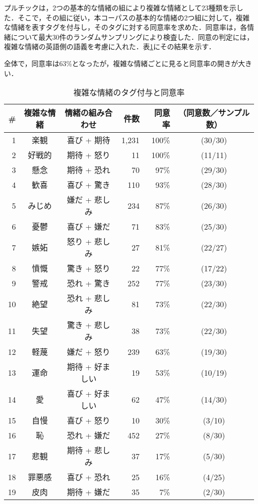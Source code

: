 \documentclass[japanese]{jnlp_1.3c}
\begin{document}
プルチックは，2つの基本的な情緒の組により複雑な情緒として23種類を示した．そこで，その組に従い，本コーパスの基本的な情緒の2つ組に対して，複雑な情緒を表すタグを付与し，そのタグに対する同意率を求めた．同意率は，各情緒について最大30件のランダムサンプリングにより検査した．同意の判定には，複雑な情緒の英語側の語義を考慮に入れた．表\ref{tab7}にその結果を示す．

全体で，同意率は63\%となったが，複雑な情緒ごとに見ると同意率の開きが大きい．

\begin{table}[t]
\begin{center}
\caption{複雑な情緒のタグ付与と同意率} \label{tab7}
\begin{tabular}{rccrrc}
\hline \hline
\#&複雑な情緒&情緒の組み合わせ&件数 &同意率&（同意数／サンプル数）\\
\hline
1&楽観     &喜び + 期待    &1,231 &100\%  &(30/30)\\
2&好戦的   &期待 + 怒り    &11   &100\%  &(11/11)\\
3&懸念     &期待 + 恐れ    &70   &97\%   &(29/30)\\
4&歓喜     &喜び + 驚き    &110  &93\%   &(28/30)\\
5&みじめ   &嫌だ + 悲しみ  &234  &87\%   &(26/30)\\
6&憂鬱     &喜び + 嫌だ    &71   &83\%   &(25/30)\\
7&嫉妬     &怒り + 悲しみ  &27   &81\%   &(22/27)\\
8&憤慨     &驚き + 怒り    &22   &77\%   &(17/22)\\
9&警戒     &恐れ + 驚き    &252  &77\%   &(23/30)\\
10&絶望     &恐れ + 悲しみ  &81   &73\%   &(22/30)\\
11&失望     &驚き + 悲しみ  &38   &73\%   &(22/30)\\
12&軽蔑     &嫌だ + 怒り    &239  &63\%   &(19/30)\\
13&運命     &期待 + 好ましい&19   &53\%   &(10/19)\\
14&愛       &喜び + 好ましい&62   &47\%   &(14/30)\\
15&自慢     &喜び + 怒り    &10   &30\%   &(3/10)\\
16&恥       &恐れ + 嫌だ    &452  &27\%   &(8/30)\\
17&悲観     &期待 + 悲しみ  &37   &17\%   &(5/30)\\
18&罪悪感   &喜び + 恐れ    &25   &16\%   &(4/25)\\
19&皮肉     &期待 + 嫌だ    &35   &7\%    &(2/30)\\

\end{tabular}
\end{center}
\end{table}
\end{document}
